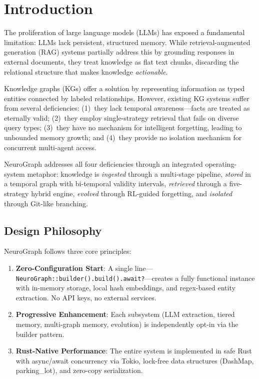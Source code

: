 \documentclass[11pt,a4paper,twocolumn]{article}
\begin{document}
\section{Introduction}
\label{sec:intro}

The proliferation of large language models (LLMs) has exposed a
fundamental limitation: LLMs lack persistent, structured memory.
While retrieval-augmented generation (RAG) systems partially address
this by grounding responses in external documents, they treat knowledge
as flat text chunks, discarding the relational structure that makes
knowledge \emph{actionable}.

Knowledge graphs (KGs) offer a solution by representing information as
typed entities connected by labeled relationships. However, existing KG
systems suffer from several deficiencies: (1)~they lack temporal
awareness---facts are treated as eternally valid; (2)~they employ
single-strategy retrieval that fails on diverse query types;
(3)~they have no mechanism for intelligent forgetting, leading to
unbounded memory growth; and (4)~they provide no isolation mechanism
for concurrent multi-agent access.

NeuroGraph addresses all four deficiencies through an integrated
operating-system metaphor: knowledge is \emph{ingested} through a
multi-stage pipeline, \emph{stored} in a temporal graph with
bi-temporal validity intervals, \emph{retrieved} through a
five-strategy hybrid engine, \emph{evolved} through RL-guided
forgetting, and \emph{isolated} through Git-like branching.

\subsection{Design Philosophy}

NeuroGraph follows three core principles:

\begin{enumerate}[leftmargin=*]
  \item \textbf{Zero-Configuration Start}: A single line---
    \lstinline{NeuroGraph::builder().build().await?}---creates a
    fully functional instance with in-memory storage, local hash
    embeddings, and regex-based entity extraction. No API keys,
    no external services.
  \item \textbf{Progressive Enhancement}: Each subsystem (LLM
    extraction, tiered memory, multi-graph memory, evolution) is
    independently opt-in via the builder pattern.
  \item \textbf{Rust-Native Performance}: The entire system is
    implemented in safe Rust with async/await concurrency via
    Tokio, lock-free data structures (DashMap, parking\_lot),
    and zero-copy serialization.
\end{enumerate}
\end{document}
